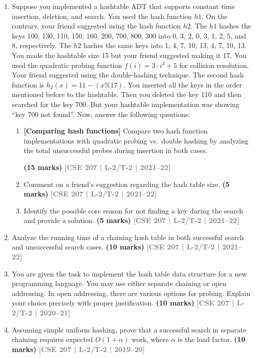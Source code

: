 \documentclass[12pt,a3paper]{article}
\newcommand{\yr}[1]{\hfill\textcolor{gray}{\small\textbf{[#1]}}}
\newcommand{\mk}[1]{\textcolor{orange!70!black}{\small\textbf{(#1 marks)}}}
\begin{document}
\begin{enumerate}
\item Suppose you implemented a hashtable ADT that supports constant time insertion, deletion, and search. You used the hash function $h1$. On the contrary, your friend suggested using the hash function $h2$. The $h1$ hashes the keys 100, 130, 110, 150, 160, 200, 700, 800, 300 into 0, 3, 2, 0, 3, 1, 2, 5, and 8, respectively. The $h2$ hashes the same keys into 1, 4, 7, 10, 13, 4, 7, 10, 13. You made the hashtable size 15 but your friend suggested making it 17. You used the quadratic probing function $f(i) = 3 \cdot i^2 + 5$ for collision resolution. Your friend suggested using the double-hashing technique. The second hash function is $h_2(x) = 11 - (x \% 17)$. You inserted all the keys in the order mentioned before to the hashtable. Then you deleted the key 110 and then searched for the key 700. But your hashtable implementation was showing ``key 700 not found''. Now, answer the following questions:
\begin{enumerate}
\item \textbf{[Comparing hash functions]} Compare two hash function implementations with quadratic probing vs.\ double hashing by analyzing the total unsuccessful probes during insertion in both cases.
 
\mk{15} \yr{CSE 207 | L-2/T-2 | 2021--22}

\item Comment on a friend's suggestion regarding the hash table size.
\mk{5} \yr{CSE 207 | L-2/T-2 | 2021--22}

\item Identify the possible core reason for not finding a key during the search and provide a solution.
\mk{5} \yr{CSE 207 | L-2/T-2 | 2021--22}

\end{enumerate}

\item Analyze the running time of a chaining hash table in both successful search and unsuccessful search cases.
\mk{10} \yr{CSE 207 | L-2/T-2 | 2021--22}

\item You are given the task to implement the hash table data structure for a new programming language. You may use either separate chaining or open addressing. In open addressing, there are various options for probing. Explain your choice precisely with proper justification.
\mk{10} \yr{CSE 207 | L-2/T-2 | 2020--21}

\item Assuming simple uniform hashing, prove that a successful search in separate chaining requires expected $O(1 + \alpha)$ work, where $\alpha$ is the load factor.
\mk{10} \yr{CSE 207 | L-2/T-2 | 2019--20}


\end{enumerate}
\end{document}
